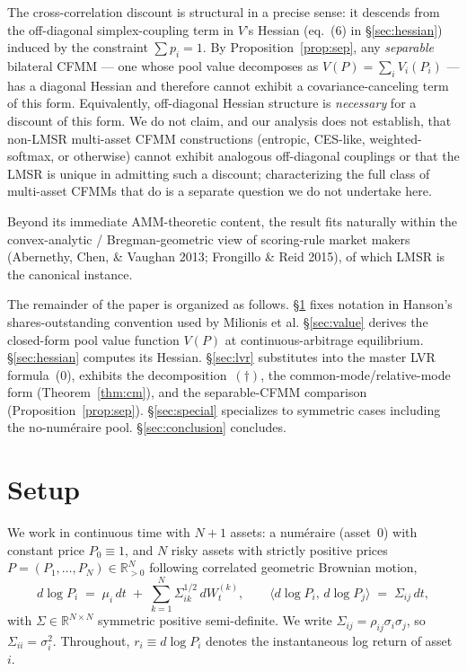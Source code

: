 \documentclass[11pt]{article}
\newcommand{\R}{\mathbb{R}}
\begin{document}
The cross-correlation discount is structural in a precise sense: it descends from the off-diagonal simplex-coupling term in $V$'s Hessian (eq.~(6) in \S\ref{sec:hessian}) induced by the constraint $\sum p_i = 1$. By Proposition~\ref{prop:sep}, any \emph{separable} bilateral CFMM --- one whose pool value decomposes as $V(P) = \sum_i V_i(P_i)$ --- has a diagonal Hessian and therefore cannot exhibit a covariance-canceling term of this form. Equivalently, off-diagonal Hessian structure is \emph{necessary} for a discount of this form. We do not claim, and our analysis does not establish, that non-LMSR multi-asset CFMM constructions (entropic, CES-like, weighted-softmax, or otherwise) cannot exhibit analogous off-diagonal couplings or that the LMSR is unique in admitting such a discount; characterizing the full class of multi-asset CFMMs that do is a separate question we do not undertake here.

Beyond its immediate AMM-theoretic content, the result fits naturally within the convex-analytic / Bregman-geometric view of scoring-rule market makers (Abernethy, Chen, \& Vaughan 2013; Frongillo \& Reid 2015), of which LMSR is the canonical instance.

The remainder of the paper is organized as follows. \S\ref{sec:setup} fixes notation in Hanson's shares-outstanding convention used by Milionis et al. \S\ref{sec:value} derives the closed-form pool value function $V(P)$ at continuous-arbitrage equilibrium. \S\ref{sec:hessian} computes its Hessian. \S\ref{sec:lvr} substitutes into the master LVR formula~(0), exhibits the decomposition~$(\dagger)$, the common-mode/relative-mode form (Theorem~\ref{thm:cm}), and the separable-CFMM comparison (Proposition~\ref{prop:sep}). \S\ref{sec:special} specializes to symmetric cases including the no-num\'eraire pool. \S\ref{sec:conclusion} concludes.

\section{Setup}\label{sec:setup}

We work in continuous time with $N+1$ assets: a num\'eraire (asset~$0$) with constant price $P_0 \equiv 1$, and $N$ risky assets with strictly positive prices $P = (P_1, \dots, P_N) \in \R^N_{>0}$ following correlated geometric Brownian motion,
\[
d\log P_i \;=\; \mu_i \, dt \;+\; \sum_{k=1}^N \Sigma^{1/2}_{ik}\, dW^{(k)}_t, \qquad \langle d\log P_i,\, d\log P_j \rangle \;=\; \Sigma_{ij}\, dt,
\]
with $\Sigma \in \R^{N\times N}$ symmetric positive semi-definite. We write $\Sigma_{ij} = \rho_{ij}\sigma_i \sigma_j$, so $\Sigma_{ii} = \sigma_i^2$. Throughout, $r_i \equiv d\log P_i$ denotes the instantaneous log return of asset~$i$.
\end{document}
